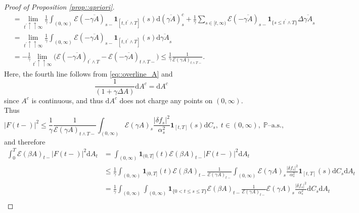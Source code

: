 \documentclass[10pt]{article} %
\newcommand\cE{\mathcal E}
\def \P{\mathbb{P}}
\newcommand{\1}{\mathbf{1}}
\def\d{\mathrm{d}}
\begin{document}
\begin{proof}[Proof of Proposition \ref{prop::apriori}]
\begin{align}
	&= \lim_{t^\prime \uparrow\uparrow \infty}\frac{1}{\gamma}\int_{(0,\infty)} \cE(-\overline{\gamma A})_{s-} \mathbf{1}_{[t,t^\prime \land T]}(s) \d (\overline{\gamma A})^c_s + \frac{1}{\gamma}\sum_{s \in [t,\infty)} \cE(-\overline{\gamma A})_{s-}\mathbf{1}_{\{s \leq t^\prime \land T\}}\Delta\overline{\gamma A}_s \nonumber\\
	&= \lim_{t^\prime \uparrow\uparrow \infty}\frac{1}{\gamma} \int_{(0,\infty)} \cE(-\overline{\gamma A})_{s-}\mathbf{1}_{[t,t^\prime \land T]}(s) \d \overline{\gamma A}_s \nonumber\\
	&= -\frac{1}{\gamma} \lim_{t^\prime \uparrow\uparrow \infty}\bigg(\cE(-\overline{\gamma A})_{t^\prime \land T} - \cE(-\overline{\gamma A})_{{t \land T}-}\bigg) 
	\leq \frac{1}{\gamma} \frac{1}{\cE(\gamma A)_{t \land T-}}.
\end{align}
Here, the fourth line follows from \eqref{eq::overline_A} and 
\begin{equation}\label{eq::dA_cont_jumps}
	\frac{1}{(1+\gamma\Delta A)} \d A^c = \d A^c
\end{equation}
since $A^c$ is continuous, and thus $\d A^c$ does not charge any points on $(0,\infty)$.
Thus
\begin{equation*}
	|F(t-)|^2 \leq \frac{1}{\gamma} \frac{1}{\cE(\gamma A)_{t\land T-}} \int_{(0,\infty)} \cE(\gamma A)_s \frac{|\delta f_s|^2}{\alpha^2_s}\mathbf{1}_{[t,T]}(s) \d C_s,\; t \in (0,\infty), \; \text{$\P$--a.s.},
\end{equation*}
and therefore
\begin{align}\label{eq::integral_F_minus}
	\int_0^T \cE(\beta A)_{t-} |F(t-)|^2 \d A_t &= \int_{(0,\infty)} \mathbf{1}_{(0,T]}(t) \cE(\beta A)_{t-} |F(t-)|^2 \d A_t \nonumber\\
	&\leq \frac{1}{\gamma}\int_{(0,\infty)} \mathbf{1}_{(0,T]}(t) \cE(\beta A)_{t-}  \frac{1}{\cE(\gamma A)_{t-}} \int_{(0,\infty)} \cE(\gamma A)_s \frac{|\delta f_s|^2}{\alpha^2_s} \mathbf{1}_{[t,T]}(s) \d C_s \d A_t \nonumber\\
	&= \frac{1}{\gamma}\int_{(0,\infty)}\int_{(0,\infty)}\mathbf{1}_{\{0<t\leq s \leq T\}} \cE(\beta A)_{t-}  \frac{1}{\cE(\gamma A)_{t-}} \cE(\gamma A)_s \frac{|\delta f_s|^2}{\alpha^2_s} \d C_s \d A_t \nonumber\\

\end{align}
\end{proof}
\end{document}
